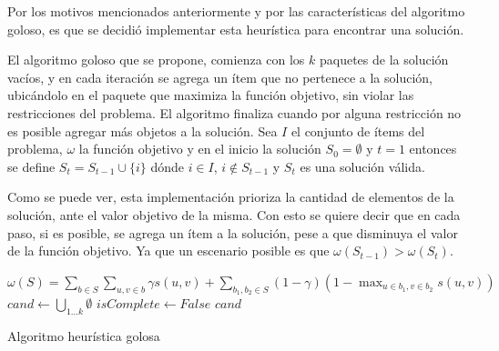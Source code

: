 Por los motivos mencionados anteriormente y por las características del algoritmo goloso, es que se decidió implementar esta heurística para encontrar una solución. 

El algoritmo goloso que se propone, comienza con los $k$ paquetes de la solución vacíos, y en cada iteración se agrega un ítem que no pertenece a la solución, ubicándolo en el paquete que maximiza la función objetivo, sin violar las restricciones del problema. El algoritmo finaliza cuando por alguna restricción no es posible agregar más objetos a la solución. Sea $I$ el conjunto de ítems del problema, $\omega$ la función objetivo y en el inicio la solución $S_0 = \emptyset$ y $t=1$ entonces se define $S_t = S_{t-1} \cup \{i\}$ dónde $i \in I$, $i \notin S_{t-1}$ y $S_t$ es una solución válida. 

Como se puede ver, esta implementación prioriza la cantidad de elementos de la solución, ante el valor objetivo de la misma. Con esto se quiere decir que en cada paso, si es posible, se agrega un ítem a la solución, pese a que disminuya el valor de la función objetivo. Ya que un escenario posible es que $\omega(S_{t-1}) > \omega(S_t)$.

\begin{center}
	\begin{algorithm}[H]
	\DontPrintSemicolon
	\SetAlgoLined
		$\omega(S) = \sum_{b \in S}{\sum_{u,v \in b}{\gamma s(u,v)}} + \sum_{b_1,b_2 \in S}{(1-\gamma) (1-\max_{u \in b_1, v \in b_2}{s(u,v)})}$\;
		$cand \leftarrow \bigcup_{1 \ldots k}\emptyset$\;
		$isComplete \leftarrow False$\;
		\Return $cand$\;
	\caption{Algoritmo heurística golosa}\label{alg:algHeuGol}
	\end{algorithm}
\end{center}


